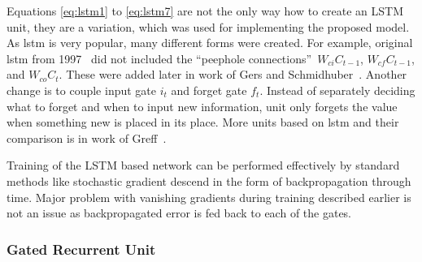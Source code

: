 Equations \eqref{eq:lstm1} to \eqref{eq:lstm7} are not the only way how to create an LSTM unit, they are a variation, which was used for implementing the proposed model. As \gls{lstm} is very popular, many different forms were created. For example, original \gls{lstm} from 1997~\cite{Hochreiter:1997:LSM:1246443.1246450} did not included the \textquotedblleft peephole connections\textquotedblright\ $ W_{ci}C_{t-1} $, $ W_{cf}C_{t-1} $, and $ W_{co}C_t $. These were added later in work of Gers and Schmidhuber~\cite{DBLP:conf/ijcnn/GersS00}. Another change is to couple input gate $ i_t $ and forget gate $ f_t $. Instead of separately deciding what to forget and when to input new information, unit only forgets the value when something new is placed in its place. More units based on \gls{lstm} and their comparison is in work of Greff~\cite{DBLP:journals/corr/GreffSKSS15}.

Training of the LSTM based network can be performed effectively by standard methods like stochastic gradient descend in the form of backpropagation through time. Major problem with vanishing gradients during training described earlier is not an issue as backpropagated error is fed back to each of the gates.

\subsubsection{Gated Recurrent Unit}\label{subsubsec:gru}

